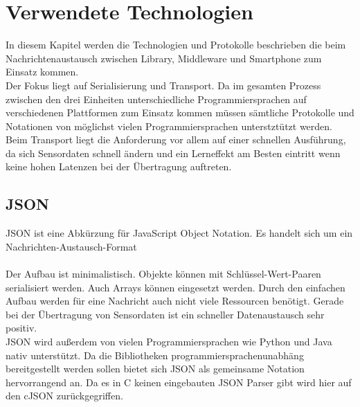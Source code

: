 \documentclass[11pt,a4paper]{report}
\begin{document}
\section{Verwendete Technologien}
In diesem Kapitel werden die Technologien und Protokolle beschrieben die beim Nachrichtenaustausch zwischen Library, Middleware und Smartphone zum Einsatz kommen.
\\
Der Fokus liegt auf Serialisierung und Transport.
Da im gesamten Prozess zwischen den drei Einheiten unterschiedliche Programmiersprachen auf verschiedenen Plattformen zum Einsatz kommen müssen sämtliche Protokolle und Notationen von möglichst vielen Programmiersprachen unterstztützt werden.
\\
Beim Transport liegt die Anforderung vor allem auf einer schnellen Ausführung, da sich Sensordaten schnell ändern und ein Lerneffekt am Besten eintritt wenn keine hohen Latenzen bei der Übertragung auftreten.

\subsection{JSON}
JSON ist eine Abkürzung für JavaScript Object Notation.
Es handelt sich um ein Nachrichten-Austausch-Format \cite{json}
\\\\
Der Aufbau ist minimalistisch. Objekte können mit Schlüssel-Wert-Paaren serialisiert werden.
Auch Arrays können eingesetzt werden.
Durch den einfachen Aufbau werden für eine Nachricht auch nicht viele Ressourcen benötigt.
Gerade bei der Übertragung von Sensordaten ist ein schneller Datenaustausch sehr positiv.
\\
JSON wird außerdem von vielen Programmiersprachen wie Python und Java nativ unterstützt.
Da die Bibliotheken programmiersprachenunabhäng bereitgestellt werden sollen bietet sich JSON als gemeinsame Notation hervorrangend an.
Da es in C keinen eingebauten JSON Parser gibt wird hier auf den cJSON \cite{cjson} zurückgegriffen.
\end{document}
